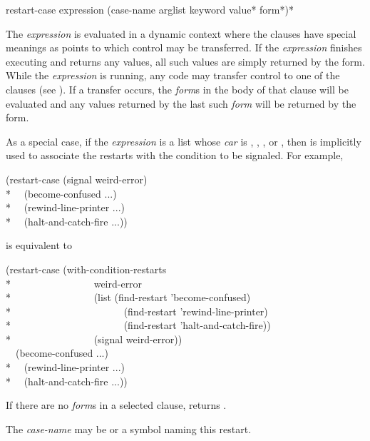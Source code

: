 \begin{defmac}
restart-case expression {(case-name arglist
                         {keyword value}*
                         {form}*)}*

  The \emph{expression} is evaluated in a dynamic context where the clauses have 
  special meanings as points to which control may be transferred. If the \emph{expression}
  finishes executing and returns any values, all such values are simply
  returned by the  form. While the \emph{expression} is running, any code may
  transfer control to one of the clauses (see ). If a transfer
  occurs, the \emph{form\/}s in the body of that clause will be evaluated and any values
  returned by the last such \emph{form} will be returned by the  form.

As a special case,
if the \emph{expression} is a list whose \emph{car} is , ,
     , or , then  is implicitly
     used to associate the restarts with the condition to be signaled.
For example,
\begin{lisp}
(restart-case (signal weird-error) \\*
~~(become-confused ...) \\*
~~(rewind-line-printer ...) \\*
~~(halt-and-catch-fire ...))
\end{lisp}
     is equivalent to
\begin{lisp}
(restart-case (with-condition-restarts \\*
~~~~~~~~~~~~~~~~weird-error  \\*
~~~~~~~~~~~~~~~~(list (find-restart 'become-confused)  \\*
~~~~~~~~~~~~~~~~~~~~~~(find-restart 'rewind-line-printer) \\*
~~~~~~~~~~~~~~~~~~~~~~(find-restart 'halt-and-catch-fire)) \\*
~~~~~~~~~~~~~~~~(signal weird-error)) \\
~~(become-confused ...) \\*
~~(rewind-line-printer ...) \\*
~~(halt-and-catch-fire ...))
\end{lisp}

  If there are no \emph{form\/}s in a selected clause,  returns .

  The \emph{case-name} may be  or a symbol naming this restart.


\end{defmac}
